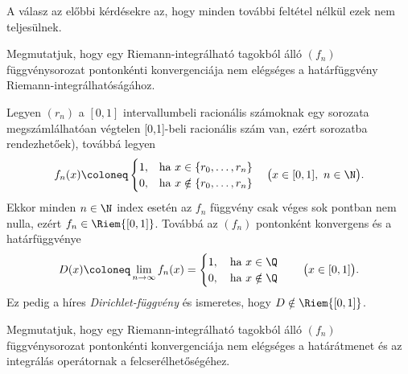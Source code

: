 \documentclass[
]{elteikthesis}[2024/04/26]
\begin{document}
	A válasz az előbbi kérdésekre az, hogy minden további feltétel nélkül ezek nem teljesülnek.
	
	Megmutatjuk, hogy egy Riemann-integrálható tagokból álló \( (f_n) \) függvénysorozat pontonkénti konvergenciája nem elégséges a határfüggvény Riemann-integrálhatóságához.
	
	Legyen \( (r_n) \) a \( [0, 1] \) intervallumbeli racionális számoknak egy sorozata megszámlálhatóan végtelen [0,1]-beli racionális szám van, ezért sorozatba rendezhetőek), továbbá legyen
	\[
		f_n(x) \coloneq 
		\begin{cases}
			1, & \text{ha } x \in    \{ r_0, \dots, r_n \} \\
			0, & \text{ha } x \notin \{ r_0, \dots, r_n \}
		\end{cases}
		\quad \bigl( x \in [0, 1],\ n \in \N \bigr).
	\]
	Ekkor minden \( n \in \N \) index esetén az \( f_n \) függvény csak véges sok pontban nem nulla, ezért \( f_n \in \Riem{[0, 1]} \).
	Továbbá az \( (f_n) \) pontonként konvergens és a határfüggvénye
	\[
		D(x) \coloneq 
		\lim_{n \to \infty} f_n(x) =
		\begin{cases}
			1, \quad \text{ha } x \in    \Q \\
			0, \quad \text{ha } x \notin \Q
		\end{cases}
		\quad \bigl( x \in [0, 1] \bigr).
	\]
	Ez pedig a híres \emph{Dirichlet-függvény} és ismeretes, hogy \( D \notin \Riem{[0, 1]} \).
	
	Megmutatjuk, hogy egy Riemann-integrálható tagokból álló \( (f_n) \) függvénysorozat pontonkénti konvergenciája nem elégséges a határátmenet és az integrálás operátornak a felcserélhetőségéhez.
	
\end{document}
